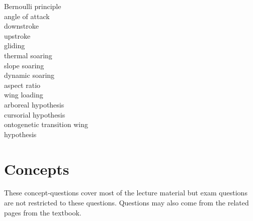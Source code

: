 \documentclass[nofonts, letterpaper]{tufte-handout}
\begin{document}
\begin{multicols}{2}
Bernoulli principle \\
angle of attack \\
downstroke \\
upstroke \\
gliding \\
thermal soaring \\
slope soaring \\
dynamic soaring \\
aspect ratio \\
wing loading \\
arboreal hypothesis \\
cursorial hypothesis \\
ontogenetic transition wing\\\hspace{1em} hypothesis
\end{multicols}

\section{Concepts}

These concept-questions cover most of the lecture material but exam questions are not restricted to these questions. Questions may also come from the related pages from the textbook.\vspace{\baselineskip}
\end{document}
